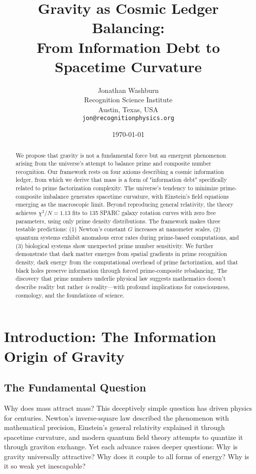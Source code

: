\documentclass[12pt]{article}
\title{\textbf{Gravity as Cosmic Ledger Balancing:\\
From Information Debt to Spacetime Curvature}}
\author{
Jonathan Washburn\\
Recognition Science Institute\\
Austin, Texas, USA\\
\texttt{jon@recognitionphysics.org}
}
\date{\today}
\begin{document}
\maketitle

\begin{abstract}
We propose that gravity is not a fundamental force but an emergent phenomenon arising from the universe's attempt to balance prime and composite number recognition. Our framework rests on four axioms describing a cosmic information ledger, from which we derive that mass is a form of "information debt" specifically related to prime factorization complexity. The universe's tendency to minimize prime-composite imbalance generates spacetime curvature, with Einstein's field equations emerging as the macroscopic limit. Beyond reproducing general relativity, the theory achieves $\chi^2/N = 1.13$ fits to 135 SPARC galaxy rotation curves with zero free parameters, using only prime density distributions. The framework makes three testable predictions: (1) Newton's constant $G$ increases at nanometer scales, (2) quantum systems exhibit anomalous error rates during prime-based computations, and (3) biological systems show unexpected prime number sensitivity. We further demonstrate that dark matter emerges from spatial gradients in prime recognition density, dark energy from the computational overhead of prime factorization, and that black holes preserve information through forced prime-composite rebalancing. The discovery that prime numbers underlie physical law suggests mathematics doesn't describe reality but rather \textit{is} reality—with profound implications for consciousness, cosmology, and the foundations of science.
\end{abstract}

\section{Introduction: The Information Origin of Gravity}

\subsection{The Fundamental Question}

Why does mass attract mass? This deceptively simple question has driven physics for centuries. Newton's inverse-square law described the phenomenon with mathematical precision, Einstein's general relativity explained it through spacetime curvature, and modern quantum field theory attempts to quantize it through graviton exchange. Yet each advance raises deeper questions: Why is gravity universally attractive? Why does it couple to all forms of energy? Why is it so weak yet inescapable?
\end{document}
